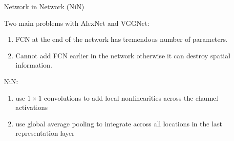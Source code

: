 \documentclass[aspectratio=169,xcolor=dvipsnames,svgnames,x11names,fleqn]{beamer}
\begin{document}
\begin{frame}{Network in Network (NiN)}

Two main problems with AlexNet and VGGNet:
\begin{enumerate}
\item FCN at the end of the network has tremendous number of parameters.
\item Cannot add FCN earlier in the network otherwise it can destroy spatial information.
\end{enumerate}
NiN:

\begin{enumerate}
\item use  $1\times 1$ convolutions to add local nonlinearities across the channel activations
\item use global average pooling to integrate across all locations in the last representation layer
\end{enumerate}

\end{frame}
\end{document}
